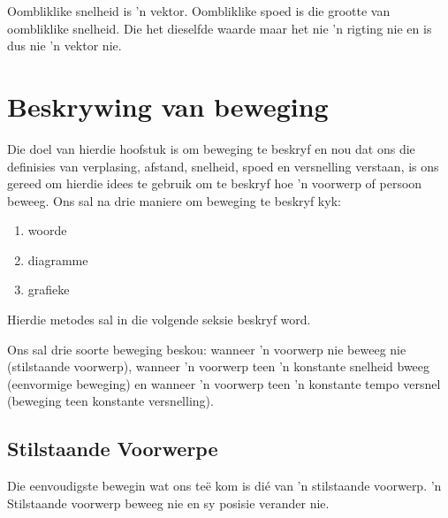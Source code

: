 Oombliklike snelheid is 'n vektor. Oombliklike spoed is die grootte van oombliklike snelheid. Die het dieselfde waarde maar het nie 'n rigting nie en is dus nie 'n vektor nie.


\section{Beskrywing van beweging}

Die doel van hierdie hoofstuk is om beweging te beskryf en nou dat ons die definisies van verplasing, afstand, snelheid, spoed en versnelling verstaan, is ons gereed om hierdie idees te gebruik om te beskryf hoe 'n voorwerp of persoon beweeg. Ons sal na drie maniere  om beweging te beskryf kyk:\par 
\begin{enumerate}[noitemsep, label=\textbf{\arabic*}. ] 
    \item woorde
    \item diagramme
    \item grafieke
\end{enumerate}
Hierdie metodes sal in die volgende seksie beskryf word. \par 
Ons sal drie soorte beweging beskou: wanneer 'n voorwerp nie beweeg nie (stilstaande voorwerp), wanneer 'n voorwerp teen 'n konstante snelheid bweeg (eenvormige beweging) en wanneer 'n voorwerp teen 'n konstante tempo versnel (beweging teen konstante versnelling).\par 

\subsection*{Stilstaande Voorwerpe}
\nopagebreak
Die eenvoudigste bewegin wat ons te\"e kom is di\'e van 'n stilstaande voorwerp. 'n Stilstaande voorwerp beweeg nie en sy posisie verander nie.

